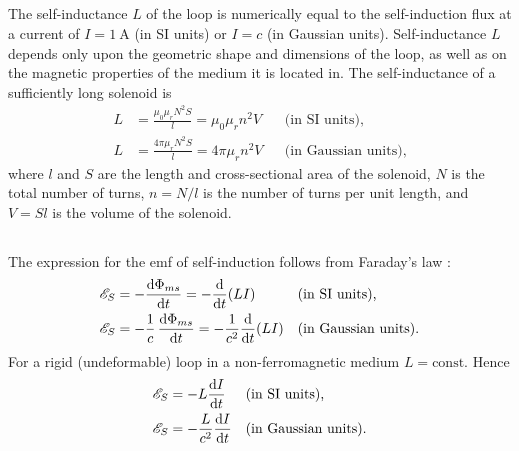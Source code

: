 \subsection{}\label{25.2.3} The self-inductance $L$ of the loop is numerically equal to the self-induction flux at a current of $I = \SI{1}{\ampere}$ (in SI units) or $I = c$ (in Gaussian units). Self-inductance $L$ depends only upon the geometric shape and dimensions of the loop, as well as on the magnetic properties of the medium it is located in. The self-inductance of a sufficiently long solenoid  is
\begin{align*}%
L & = \frac{\mu_{0}\mu_{r}N^{2}S}{l}= \mu_{0}\mu_{r}n^{2}V&& \text{(in SI units),} \\
L & = \frac{4 \pi \mu_{r}N^{2}S}{l}= 4 \pi\mu_{r}n^{2}V &&  \text{(in Gaussian units),}
\end{align*}
where $l$ and $S$ are the length and cross-sectional area of the solenoid, $N$ is the total number of turns, $n = N/l$ is the number of turns per unit length, and $V = Sl$ is the volume of the solenoid.

\subsection{}\label{25.2.4} The expression for the emf of self-induction follows from Faraday's law :
\begin{align*}%
\emf_{S} & = - \dv{\Phi_{ms}}{t} = - \dv{t} (LI)&& \text{(in SI units),} \\
\emf_{S} & = - \frac{1}{c} \,\dv{\Phi_{ms}}{t} = - \frac{1}{c^{2}}\dv{t} (LI)&&  \text{(in Gaussian units).}
\end{align*}
For a rigid (undeformable) loop in a non-ferromagnetic medium  $L = \text{const.}$ Hence
\begin{align*}%
\emf_{S} & = - L \dv{I}{t} && \text{(in SI units),} \\
\emf_{S} & = - \frac{L}{c^{2}} \dv{I}{t} &&  \text{(in Gaussian units).}
\end{align*}

